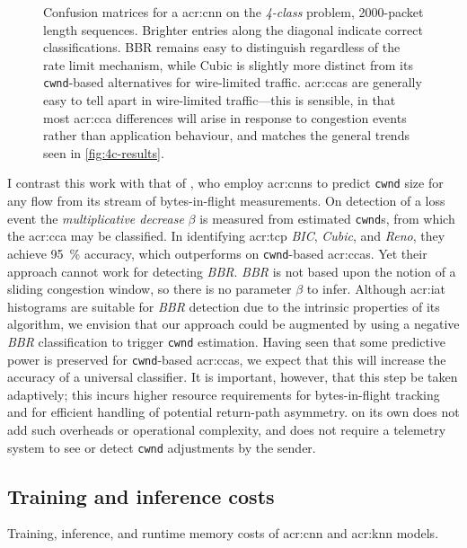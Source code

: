 \begin{figure}
    \caption[Confusion matrices for a CNN on the \emph{4-class} problem, \num{2000}-packet length sequences.]{Confusion matrices for a \gls{acr:cnn} on the \emph{4-class} problem, \num{2000}-packet length sequences. Brighter entries along the diagonal indicate correct classifications. BBR remains easy to distinguish regardless of the rate limit mechanism, while Cubic is slightly more distinct from its \texttt{cwnd}-based alternatives for wire-limited traffic. \glspl{acr:cca} are generally easy to tell apart in wire-limited traffic---this is sensible, in that most \gls{acr:cca} differences will arise in response to congestion events rather than application behaviour, and matches the general trends seen in \cref{fig:4c-results}.}
    \label{fig:4c-cnn-conf}
\end{figure}

I contrast this work with that of \textcite{DBLP:conf/icccn/HagosEYK18}, who employ \glspl{acr:cnn} to predict \texttt{cwnd} size for any flow from its stream of bytes-in-flight measurements.
On detection of a loss event the \emph{multiplicative decrease} $\beta$ is measured from estimated \texttt{cwnd}s, from which the \gls{acr:cca} may be classified.
In identifying \gls{acr:tcp} \emph{BIC}, \emph{Cubic}, and \emph{Reno}, they achieve \qty{95}{\percent} accuracy, which outperforms \seidr{} on \texttt{cwnd}-based \glspl{acr:cca}.
Yet their approach cannot work for detecting \emph{BBR}. 
\emph{BBR} is not based upon the notion of a sliding congestion window, so there is no parameter $\beta$ to infer.
Although \gls{acr:iat} histograms are suitable for \emph{BBR} detection due to the intrinsic properties of its algorithm, we envision that our approach could be augmented by using a negative \emph{BBR} classification to trigger \texttt{cwnd} estimation.
Having seen that some predictive power is preserved for \texttt{cwnd}-based \glspl{acr:cca}, we expect that this will increase the accuracy of a universal classifier.
It is important, however, that this step be taken adaptively; this incurs higher resource requirements for bytes-in-flight tracking and for efficient handling of potential return-path asymmetry.
\seidr{} on its own does not add such overheads or operational complexity, and does not require a telemetry system to see or detect \texttt{cwnd} adjustments by the sender.

\subsection{Training and inference costs}
\begin{table}[]
    \centering
    \caption[Training, inference, and runtime memory costs of CNN and $k$NN models.]{Training, inference, and runtime memory costs of \gls{acr:cnn} and \gls{acr:knn} models.}
    \label{tab:train-test-times}
\end{table}

